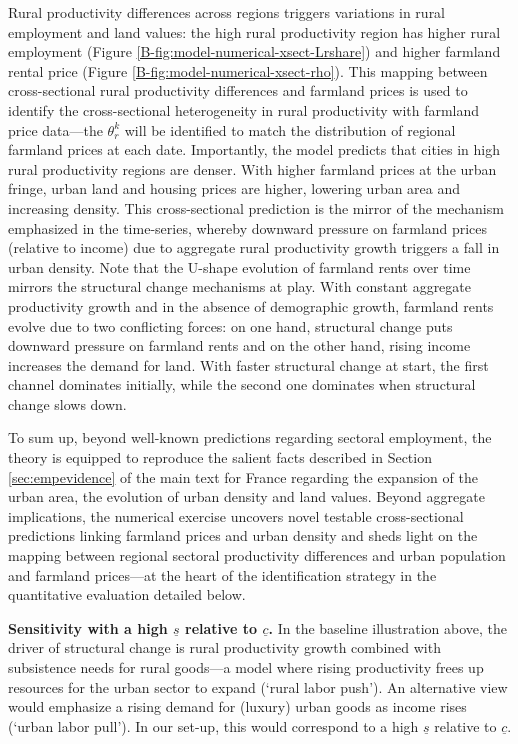 \documentclass[11pt]{report}
\begin{document}
Rural productivity differences across regions triggers variations in rural employment and land values: the high rural productivity region has higher rural employment (Figure \ref{B-fig:model-numerical-xsect-Lrshare}) and higher farmland rental price (Figure \ref{B-fig:model-numerical-xsect-rho}). This mapping between cross-sectional rural productivity differences and farmland prices is used to identify the cross-sectional heterogeneity in rural productivity with farmland price data---the $\theta_{r}^k$ will be identified to match the distribution of regional farmland prices at each date. Importantly, the model predicts that cities in high rural productivity regions are denser. With higher farmland prices at the urban fringe, urban land and housing prices are higher, lowering urban area and increasing density. This cross-sectional prediction is the mirror of the mechanism emphasized in the time-series, whereby downward pressure on farmland prices (relative to income) due to aggregate rural productivity growth triggers a fall in urban density. Note that the U-shape evolution of farmland rents over time mirrors the structural change mechanisms at play. With constant aggregate productivity growth and in the absence of demographic growth, farmland rents evolve due to two conflicting forces: on one hand, structural change puts downward pressure on farmland rents and on the other hand, rising income increases the demand for land. With faster structural change at start, the first channel dominates initially, while the second one dominates when structural change slows down.

To sum up, beyond well-known predictions regarding sectoral employment, the theory is equipped to reproduce the salient facts described in Section \ref{sec:empevidence} of the main text for France regarding the expansion of the urban area, the evolution of urban density and land values. Beyond aggregate implications, the numerical exercise uncovers novel testable cross-sectional predictions linking farmland prices and urban density and sheds light on the mapping between regional sectoral productivity differences and urban population and farmland prices---at the heart of the identification strategy in the quantitative evaluation detailed below. 


\textbf{Sensitivity with a high $\underline{s}$ relative to $\underline{c}$.} In the baseline illustration above, the driver of structural change is rural productivity growth combined with subsistence needs for rural goods---a model where rising productivity frees up resources for the urban sector to expand (`rural labor push'). An alternative view would emphasize a rising demand for (luxury) urban goods as income rises (`urban labor pull'). In our set-up, this would correspond to a high $\underline{s}$ relative to $\underline{c}$. 
\end{document}
